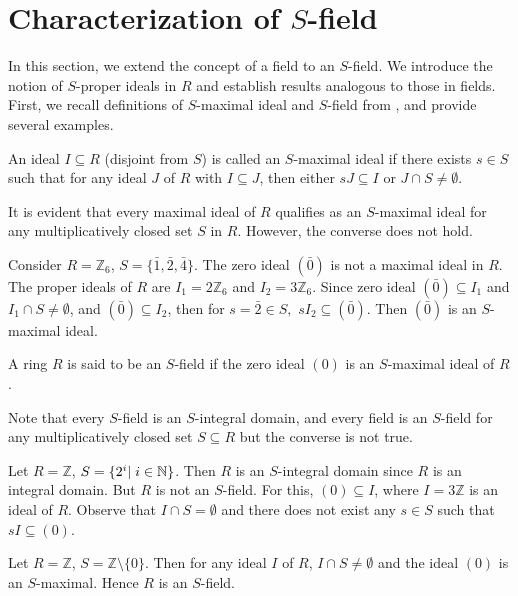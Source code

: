 \documentclass[11pt]{article}
\begin{document}
	
\section{Characterization of $S$-field}	\label{sec}
In this section, we extend the concept of a field to an $S$-field. We introduce the notion of $S$-proper ideals in $R$ and establish results analogous to those in fields. First, we recall definitions of $S$-maximal ideal and $S$-field from \cite{ed20,ed22}, and provide several examples.
	\begin{deff}\cite[Definition 2.2]{ed22}\label{smax}
		An ideal $I\subseteq R$ (disjoint from $S$) is called  an $S$-maximal ideal if there exists $s\in S$ such that for any ideal $J$ of $R$ with $I\subseteq J$, then either $sJ \subseteq I$ or $J\cap S\neq\emptyset$.
	\end{deff}
	It is evident that every maximal ideal of $R$ qualifies as an $S$-maximal ideal for any multiplicatively closed set $S$ in $R$. However, the converse does not hold.
	\begin{eg}\label{eg}
		Consider $R=\mathbb{Z}_{6}$, $S=\{\bar{1}, \bar{2}, \bar{4}\}$. The zero ideal $(\bar{0})$ is not a maximal ideal in $R$. The proper ideals of $R$ are $I_1=2\mathbb{Z}_{6}$ and $I_2=3\mathbb{Z}_{6}$. Since zero ideal $(\bar{0})\subseteq I_1$ and $I_{1}\cap S\neq\emptyset$, and $(\bar{0})\subseteq I_2$, then for $s=\bar{2}\in S,$ $sI_{2}\subseteq (\bar{0})$. Then $(\bar{0})$ is an $S$-maximal ideal.
	\end{eg}
	\begin{deff}\cite[Definition 9]{ed20}\label{sfield}
		A ring $R$ is said to be an $S$-field if the zero ideal $(0)$ is an $S$-maximal ideal of $R$.
	\end{deff}
	\noindent
	Note that every $S$-field is an $S$-integral domain, and every field is an $S$-field for any multiplicatively closed set $S\subseteq R$ but the converse is not true.
	
	\begin{eg}
		Let $R=\mathbb{Z}$, $S=\{2^{i}|\hspace{0.1cm} i\in\mathbb{N}\}$. Then $R$ is an $S$-integral domain since $R$ is an integral domain. But $R$ is not an $S$-field. For this, $(0)\subseteq I$, where $I=3\mathbb{Z}$ is an ideal of $R.$ Observe that $I\cap S=\emptyset$ and there does not exist any $s\in S$ such that $sI\subseteq (0)$. 
	\end{eg}
	
	\begin{eg}\label{infi}
		Let $R = \mathbb{Z}$, $S = \mathbb{Z} \setminus \{0\}$. Then for any ideal $I$ of $R$, $I \cap S \neq \emptyset$ and the ideal $(0)$ is an $S$-maximal. Hence $R$ is an $S$-field.
	\end{eg}
	
\end{document}
